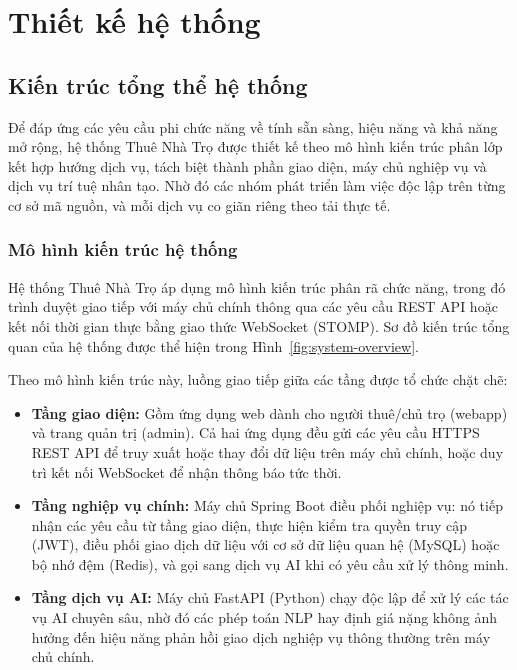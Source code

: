 \chapter{Thiết kế hệ thống}
\label{Chapter4}

\section{Kiến trúc tổng thể hệ thống}

Để đáp ứng các yêu cầu phi chức năng về tính sẵn sàng, hiệu năng và khả năng mở rộng, hệ thống Thuê Nhà Trọ được thiết kế theo mô hình kiến trúc phân lớp kết hợp hướng dịch vụ, tách biệt thành phần giao diện, máy chủ nghiệp vụ và dịch vụ trí tuệ nhân tạo. Nhờ đó các nhóm phát triển làm việc độc lập trên từng cơ sở mã nguồn, và mỗi dịch vụ co giãn riêng theo tải thực tế.

\FloatBarrier
\subsection{Mô hình kiến trúc hệ thống}

Hệ thống Thuê Nhà Trọ áp dụng mô hình kiến trúc phân rã chức năng, trong đó trình duyệt giao tiếp với máy chủ chính thông qua các yêu cầu REST API hoặc kết nối thời gian thực bằng giao thức WebSocket (STOMP). Sơ đồ kiến trúc tổng quan của hệ thống được thể hiện trong Hình~\ref{fig:system-overview}.

Theo mô hình kiến trúc này, luồng giao tiếp giữa các tầng được tổ chức chặt chẽ:
\begin{itemize}
    \item \textbf{Tầng giao diện:} Gồm ứng dụng web dành cho người thuê/chủ trọ (webapp) và trang quản trị (admin). Cả hai ứng dụng đều gửi các yêu cầu HTTPS REST API để truy xuất hoặc thay đổi dữ liệu trên máy chủ chính, hoặc duy trì kết nối WebSocket để nhận thông báo tức thời.
    \item \textbf{Tầng nghiệp vụ chính:} Máy chủ Spring Boot điều phối nghiệp vụ: nó tiếp nhận các yêu cầu từ tầng giao diện, thực hiện kiểm tra quyền truy cập (JWT), điều phối giao dịch dữ liệu với cơ sở dữ liệu quan hệ (MySQL) hoặc bộ nhớ đệm (Redis), và gọi sang dịch vụ AI khi có yêu cầu xử lý thông minh.
    \item \textbf{Tầng dịch vụ AI:} Máy chủ FastAPI (Python) chạy độc lập để xử lý các tác vụ AI chuyên sâu, nhờ đó các phép toán NLP hay định giá nặng không ảnh hưởng đến hiệu năng phản hồi giao dịch nghiệp vụ thông thường trên máy chủ chính.
\end{itemize}

